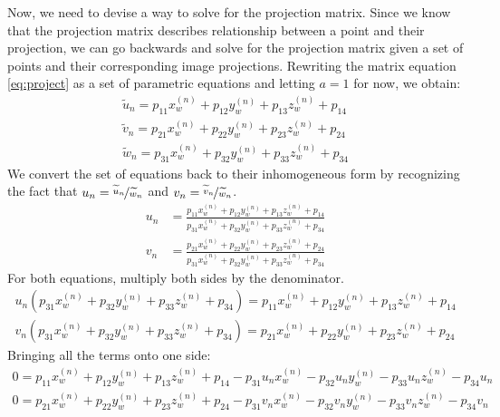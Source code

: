 Now, we need to devise a way to solve for the projection matrix. Since we know that the projection matrix describes relationship between a point and their projection, we can go backwards and solve for the projection matrix given a set of points and their corresponding image projections. Rewriting the matrix equation \ref{eq:project} as a set of parametric equations and letting $a=1$ for now, we obtain:
\begin{align*}
    \widetilde{u}_n = p_{11}x_w^{(n)} + p_{12}y_w^{(n)} + p_{13}z_w^{(n)} + p_{14} \\
    \widetilde{v}_n = p_{21}x_w^{(n)} + p_{22}y_w^{(n)} + p_{23}z_w^{(n)} + p_{24} \\
    \widetilde{w}_n = p_{31}x_w^{(n)} + p_{32}y_w^{(n)} + p_{33}z_w^{(n)} + p_{34}
\end{align*}
We convert the set of equations back to their inhomogeneous form by recognizing the fact that $u_n = \nicefrac{\widetilde{u}_n}{\widetilde{w}_n}$ and $v_n = \nicefrac{\widetilde{v}_n}{\widetilde{w}_n}$. 
\begin{align*}
    u_n & = \frac{p_{11}x_w^{(n)} + p_{12}y_w^{(n)} + p_{13}z_w^{(n)} + p_{14}}{p_{31}x_w^{(n)} + p_{32}y_w^{(n)} + p_{33}z_w^{(n)} + p_{34}} \\
    v_n & = \frac{p_{21}x_w^{(n)} + p_{22}y_w^{(n)} + p_{23}z_w^{(n)} + p_{24}}{p_{31}x_w^{(n)} + p_{32}y_w^{(n)} + p_{33}z_w^{(n)} + p_{34}}
\end{align*}
For both equations, multiply both sides by the denominator.
\begin{align*}
    u_n(p_{31}x_w^{(n)} + p_{32}y_w^{(n)} + p_{33}z_w^{(n)} + p_{34}) = p_{11}x_w^{(n)} + p_{12}y_w^{(n)} + p_{13}z_w^{(n)} + p_{14} \\
    v_n(p_{31}x_w^{(n)} + p_{32}y_w^{ (n)} + p_{33}z_w^{(n)} + p_{34}) = p_{21}x_w^{(n)} + p_{22}y_w^{(n)} + p_{23}z_w^{(n)} + p_{24}
\end{align*}
Bringing all the terms onto one side:
\begin{subequations}
    \begin{align}
        0 = p_{11}x_w^{(n)} + p_{12}y_w^{(n)} + p_{13}z_w^{(n)} + p_{14} - p_{31}u_nx_w^{(n)} - p_{32}u_ny_w^{(n)} - p_{33}u_nz_w^{(n)} - p_{34}u_n \\
        0 = p_{21}x_w^{(n)} + p_{22}y_w^{(n)} + p_{23}z_w^{(n)} + p_{24} - p_{31}v_nx_w^{(n)} - p_{32}v_ny_w^{(n)} - p_{33}v_nz_w^{(n)} - p_{34}v_n
    \end{align}
\end{subequations}


